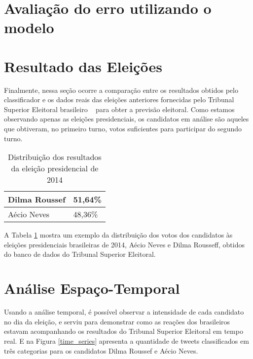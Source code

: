 \newpage

\section{Avaliação do erro utilizando o modelo}

\section{Resultado das Eleições}

Finalmente, nessa seção ocorre a comparação
entre os resultados obtidos pelo classificador e os dados
reais das eleições anteriores fornecidas pelo Tribunal Superior
Eleitoral brasileiro ~\cite{TSE} para obter a previsão eleitoral. Como
estamos observando apenas as eleições presidenciais, os candidatos
em análise são aqueles que obtiveram, no primeiro
turno, votos suficientes para participar do segundo turno.

\begin{table}[tbp]
    \centering
    \caption{Distribuição dos resultados da eleição presidencial de 2014}
    \label{tb:eleicoes2014}
    \begin{tabular}{ll}
    \hline
    Dilma Roussef & 51,64\% \\ \hline
    Aécio Neves & 48,36\% \\ \hline
    \end{tabular}
\end{table}

A Tabela \ref{tb:eleicoes2014} mostra um exemplo da distribuição dos votos
dos candidatos às eleições presidenciais brasileiras de 2014,
Aécio Neves e Dilma Rousseff, obtidos do banco de dados do
Tribunal Superior Eleitoral.




\section{Análise Espaço-Temporal}


Usando a análise temporal, é possível observar a intensidade
de cada candidato no dia da eleição, e serviu para demonstrar
como as reações dos brasileiros estavam acompanhando os
resultados do Tribunal Superior Eleitoral em tempo real. E na
Figura \ref{time_series} apresenta a quantidade de tweets classificados
em três categorias para os candidatos Dilma Roussef e
Aécio Neves.

%


